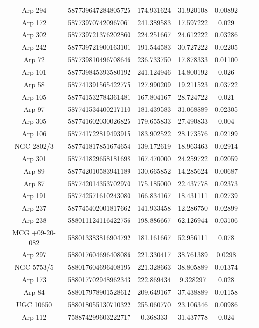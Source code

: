 \begin{table}
{\begin{tabular}{|c|c|c|c|c|c|c|}
Arp 294 & 587739647284805725 & 174.931624 & 31.920108 & 0.00892 \\
Arp 172 & 587739707420967061 & 241.389583 & 17.597222 & 0.029 \\
Arp 302 & 587739721376202860 & 224.251667 & 24.612222 & 0.03286 \\
Arp 242 & 587739721900163101 & 191.544583 & 30.727222 & 0.02205 \\
Arp 72 & 587739810496708646 & 236.733750 & 17.878333 & 0.01100 \\
Arp 101 & 587739845393580192 & 241.124946 & 14.800192 & 0.026 \\
Arp 58 & 587741391565422775 & 127.990209 & 19.211523 & 0.03722 \\
Arp 105 & 587741532784361481 & 167.804167 & 28.724722 & 0.021 \\
Arp 97 & 587741534400217110 & 181.439583 & 31.068889 & 0.02305 \\
Arp 305 & 587741602030026825 & 179.655833 & 27.490833 & 0.004 \\
Arp 106 & 587741722819493915 & 183.902522 & 28.173576 & 0.02199 \\
NGC 2802/3 & 587741817851674654 & 139.172619 & 18.963463 & 0.02914 \\
Arp 301 & 587741829658181698 & 167.470000 & 24.259722 & 0.02059 \\
Arp 89 & 587742010583941189 & 130.665852 & 14.285624 & 0.00687 \\
Arp 87 & 587742014353702970 & 175.185000 & 22.437778 & 0.02373 \\
Arp 191 & 587742571610243080 & 166.834167 & 18.431111 & 0.02739 \\
Arp 237 & 587745402001817662 & 141.933458 & 12.286750 & 0.02899 \\
Arp 238 & 588011124116422756 & 198.886667 & 62.126944 & 0.03106 \\
MCG +09-20-082 & 588013383816904792 & 181.161667 & 52.956111 & 0.078 \\
Arp 297 & 588017604696408086 & 221.330417 & 38.761389 & 0.0298 \\
NGC 5753/5 & 588017604696408195 & 221.328663 & 38.805889 & 0.01374 \\
Arp 173 & 588017702948962343 & 222.869434 & 9.328297 & 0.028 \\
Arp 84 & 588017978901528612 & 209.649167 & 37.438889 & 0.01158 \\
UGC 10650 & 588018055130710322 & 255.060770 & 23.106346 & 0.00986 \\
Arp 112 & 758874299603222717 & 0.368333 & 31.437778 & 0.024 \\

\end{tabular}}
\end{table}

